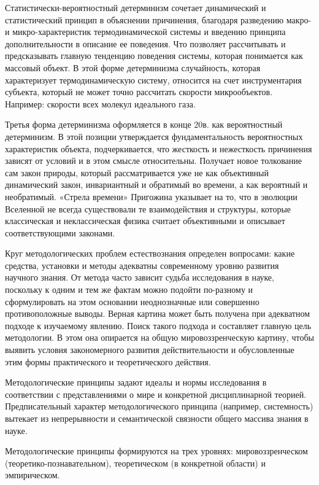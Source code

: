 \documentclass[exam_answers.tex]{subfiles}
\begin{document}
Статистически-вероятностный детерминизм сочетает динамический и
статистический принцип в объяснении причинения, благодаря разведению
макро- и микро-характеристик термодинамической системы и введению
принципа дополнительности в описание ее поведения. Что позволяет
рассчитывать и предсказывать главную тенденцию поведения системы, которая
понимается как массовый объект. В этой форме детерминизма случайность,
которая характеризует термодинамическую систему, относится на счет
инструментария субъекта, который не может точно рассчитать скорости
микрообъектов. Например: скорости всех молекул идеального газа.

Третья форма детерминизма оформляется в конце 20в. как вероятностный
детерминизм. В этой позиции утверждается фундаментальность вероятностных
характеристик объекта, подчеркивается, что жесткость и нежесткость
причинения зависят от условий и в этом смысле относительны. Получает новое
толкование сам закон природы, который рассматривается уже не как
объективный динамический закон, инвариантный и обратимый во времени, а
как вероятный и необратимый. «Стрела времени» Пригожина указывает на то,
что в эволюции Вселенной не всегда существовали те взаимодействия и
структуры, которые классическая и неклассическая физика считает
объективными и описывает соответствующими законами.

Круг методологических проблем естествознания определен вопросами:
какие средства, установки и методы адекватны современному уровню развития
научного знания. От метода часто зависит судьба исследования в науке,
поскольку к одним и тем же фактам можно подойти по-разному и
сформулировать на этом основании неоднозначные или совершенно
противоположные выводы. Верная картина может быть получена при
адекватном подходе к изучаемому явлению. Поиск такого подхода и составляет
главную цель методологии. В этом она опирается на общую
мировоззренческую картину, чтобы выявить условия закономерного развития
действительности и обусловленные этим формы практического и
теоретического действия.

Методологические принципы задают идеалы и нормы исследования в
соответствии с представлениями о мире и конкретной дисциплинарной
теорией. Предписательный характер методологического принципа (например,
системность) вытекает из непрерывности и семантической связности общего
массива знания в науке.

Методологические принципы формируются на трех уровнях:
мировоззренческом (теоретико-познавательном), теоретическом (в конкретной
области) и эмпирическом.
\end{document}
